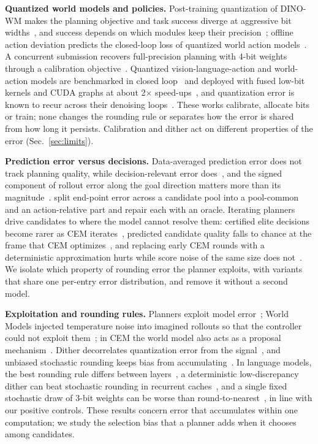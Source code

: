 \documentclass[conference]{IEEEtran}
\begin{document}
\textbf{Quantized world models and policies.} Post-training quantization of DINO-WM makes the planning objective and task success diverge at aggressive bit widths~\cite{fu2026wmquant}, and success depends on which modules keep their precision~\cite{ranganath2026bits}; offline action deviation predicts the closed-loop loss of quantized world action models~\cite{xu2026prede}. A concurrent submission recovers full-precision planning with 4-bit weights through a calibration objective~\cite{anon2026modulemse}. Quantized vision-language-action and world-action models are benchmarked in closed loop~\cite{vlaquantbench2026, qvla2026, park2026qcrl} and deployed with fused low-bit kernels and CUDA graphs at about 2$\times$ speed-ups~\cite{wang2026steerquant, anon2026wamptq, anon2026loopquant}, and quantization error is known to recur across their denoising loops~\cite{anon2026loopquant}. These works calibrate, allocate bits or train; none changes the rounding rule or separates how the error is shared from how long it persists. Calibration and dither act on different properties of the error (Sec.~\ref{sec:limits}).

\textbf{Prediction error versus decisions.} Data-averaged prediction error does not track planning quality, while decision-relevant error does~\cite{you2026predictability, wang2026drpe}, and the signed component of rollout error along the goal direction matters more than its magnitude~\cite{anon2026magnitude}. \citet{min2026lowerror} split end-point error across a candidate pool into a pool-common and an action-relative part and repair each with an oracle. Iterating planners drive candidates to where the model cannot resolve them: certified elite decisions become rarer as CEM iterates~\cite{anon2026elitecert}, predicted candidate quality falls to chance at the frame that CEM optimizes~\cite{anon2026resolution}, and replacing early CEM rounds with a deterministic approximation hurts while score noise of the same size does not~\cite{anon2026evaluations}. We isolate which property of rounding error the planner exploits, with variants that share one per-entry error distribution, and remove it without a second model.

\textbf{Exploitation and rounding rules.} Planners exploit model error~\cite{boney2019dae}; World Models injected temperature noise into imagined rollouts so that the controller could not exploit them~\cite{ha2018worldmodels}; in CEM the world model also acts as a proposal mechanism~\cite{obst2026cem}. Dither decorrelates quantization error from the signal~\cite{roberts1962picture, schuchman1964dither}, and unbiased stochastic rounding keeps bias from accumulating~\cite{gupta2015limited, croci2022sr}. In language models, the best rounding rule differs between layers~\cite{chatelain2026sr}, a deterministic low-discrepancy dither can beat stochastic rounding in recurrent caches~\cite{khilar2026dither}, and a single fixed stochastic draw of 3-bit weights can be worse than round-to-nearest~\cite{wu2026decisions}, in line with our positive controls. These results concern error that accumulates within one computation; we study the selection bias that a planner adds when it chooses among candidates.
\end{document}

